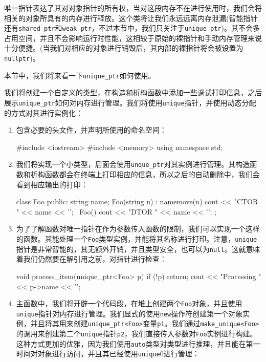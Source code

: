 唯一指针表达了其对对象指针的所有权，当对这段内存不在进行使用时，我们会将相关的对象所具有的内存进行释放。这个类将让我们永远远离内存泄漏(智能指针还有\texttt{shared\_ptr}和\texttt{weak\_ptr}，不过本节中，我们只关注于\texttt{unique\_ptr})。其不会多占用空间，并且不会影响运行时性能，这相较于原始的裸指针和手动内存管理来说十分便捷。(当我们对相应的对象进行销毁后，其内部的裸指针将会被设置为\texttt{nullptr})。

本节中，我们将来看一下\texttt{unique\_ptr}如何使用。


我们将创建一个自定义的类型，在构造和析构函数中添加一些调试打印信息，之后展示\texttt{unique\_ptr}如何对内存进行管理。我们将使用\texttt{unique}指针，并使用动态分配的方式对其进行实例化：

\begin{enumerate}
\item 包含必要的头文件，并声明所使用的命名空间：

\begin{codebox}[cpp]
#include <iostream>
#include <memory>
using namespace std;
\end{codebox}

\item 我们将实现一个小类型，后面会使用\texttt{unque\_ptr}对其实例进行管理。其构造函数和析构函数都会在终端上打印相应的信息，所以之后的自动删除中，我们会看到相应输出的打印：

\begin{codebox}[cpp]
class Foo
{
public:
    string name;
    Foo(string n)
        : name{move(n)}
    { cout << "CTOR " << name << '\n'; }
    ~Foo() { cout << "DTOR " << name << '\n'; }
};
\end{codebox}

\item 为了了解函数对唯一指针在作为参数传入函数的限制，我们可以实现一个这样的函数。其能处理一个\texttt{Foo}类型实例，并能将其名称进行打印。注意，\texttt{unique}指针是非常智能的，其无额外开销，并且类型安全，也可以为\texttt{null}。这就意味着我们仍然要在解引用之前，对指针进行检查：

\begin{codebox}[cpp]
void process_item(unique_ptr<Foo> p)
{
    if (!p) { return; }
    cout << "Processing " << p->name << '\n';
}
\end{codebox}

\item 主函数中，我们将开辟一个代码段，在堆上创建两个\texttt{Foo}对象，并且使用\texttt{unique}指针对内存进行管理。我们显式的使用\texttt{new}操作符创建第一个对象实例，并且将其用来创建\texttt{unique\_ptr<Foo>}变量\texttt{p1}。我们通过\texttt{make\_unique<Foo>}的调用来创建第二个\texttt{unique}指针\texttt{p2}，我们直接传入参数对\texttt{Foo}实例进行构建。这种方式更加的优雅，因为我们使用\texttt{auto}类型对类型进行推理，并且能在第一时间对对象进行访问，并且其已经使用\texttt{unique}0进行管理：


\end{enumerate}
